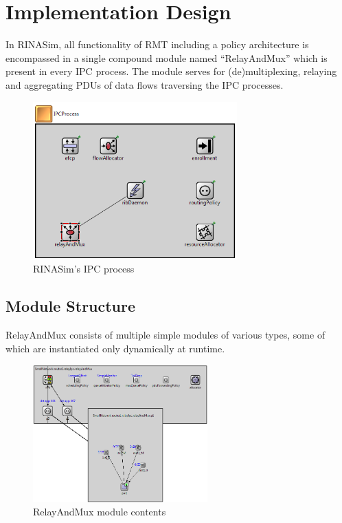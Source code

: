     \section{Implementation Design}

        In RINASim, all functionality of RMT including a policy architecture is encompassed in a single compound module named ``RelayAndMux'' which is present in every IPC process. The module serves for (de)multiplexing, relaying and aggregating PDUs of data flows traversing the IPC processes.

        \begin{figure}[H]
                \begin{center}
                    \includegraphics[width=0.7\textwidth]{fig/impl_rinasim-ipcp.png}
                  \caption{RINASim's IPC process}
                  \label{fig:rinasim:ipcp}
                \end{center}
            \end{figure}

        \subsection{Module Structure}

            RelayAndMux consists of multiple simple modules of various types, some of which are instantiated only dynamically at runtime.

            \begin{figure}[H]
                \begin{center}
                    \includegraphics[width=0.6\textwidth]{fig/impl_rinasim-rmt.png}
                  \caption{RelayAndMux module contents}
                  \label{fig:rinasim:rmt}
                \end{center}
            \end{figure}

